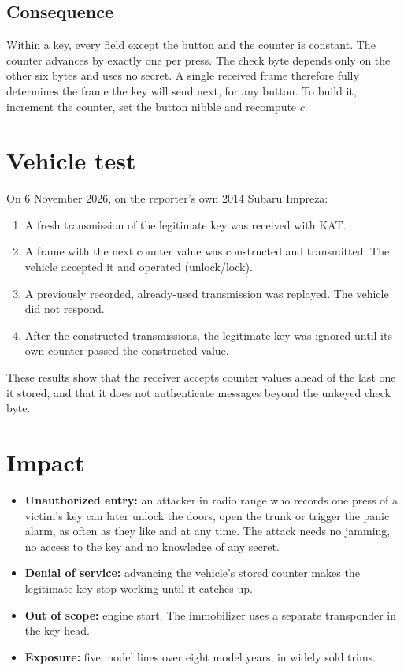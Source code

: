 \documentclass[11pt,a4paper]{article}
\begin{document}
\subsection{Consequence}
Within a key, every field except the button and the counter is constant. The counter advances by exactly one per press. The check byte depends only on the other six bytes and uses no secret. A single received frame therefore fully determines the frame the key will send next, for any button. To build it, increment the counter, set the button nibble and recompute $c$.

\section{Vehicle test}\label{sec:test}
On 6 November 2026, on the reporter's own 2014 Subaru Impreza:
\begin{enumerate}
\item A fresh transmission of the legitimate key was received with KAT.
\item A frame with the next counter value was constructed and transmitted. The vehicle accepted it and operated (unlock/lock).
\item A previously recorded, already-used transmission was replayed. The vehicle did not respond.
\item After the constructed transmissions, the legitimate key was ignored until its own counter passed the constructed value.
\end{enumerate}
These results show that the receiver accepts counter values ahead of the last one it stored, and that it does not authenticate messages beyond the unkeyed check byte.

\section{Impact}
\begin{itemize}
\item \textbf{Unauthorized entry:} an attacker in radio range who records one press of a victim's key can later unlock the doors, open the trunk or trigger the panic alarm, as often as they like and at any time. The attack needs no jamming, no access to the key and no knowledge of any secret.
\item \textbf{Denial of service:} advancing the vehicle's stored counter makes the legitimate key stop working until it catches up.
\item \textbf{Out of scope:} engine start. The immobilizer uses a separate transponder in the key head.
\item \textbf{Exposure:} five model lines over eight model years, in widely sold trims.
\end{itemize}
\end{document}

